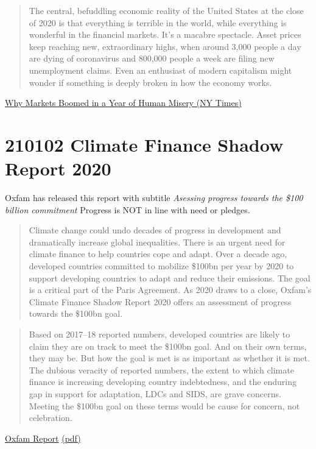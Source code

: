 \documentclass[
]{book}
\begin{document}
\begin{quote}
The central, befuddling economic reality of the United States at the close of 2020 is that everything is terrible in the world, while everything is wonderful in the financial markets.
It's a macabre spectacle. Asset prices keep reaching new, extraordinary highs, when around 3,000 people a day are dying of coronavirus and 800,000 people a week are filing new unemployment claims. Even an enthusiast of modern capitalism might wonder if something is deeply broken in how the economy works.
\end{quote}

\href{https://www.nytimes.com/2021/01/01/upshot/why-markets-boomed-2020.html}{Why Markets Boomed in a Year of Human Misery (NY Times)}

\hypertarget{climate-finance-shadow-report-2020}{%
\section{210102 Climate Finance Shadow Report 2020}\label{climate-finance-shadow-report-2020}}

Oxfam has released this report with subtitle \emph{Asessing progress towards the \$100 billion commitment}
Progress is NOT in line with need or pledges.

\begin{quote}
Climate change could undo decades of progress in development and dramatically increase global inequalities. There is an urgent need for climate finance to help countries cope and adapt.
Over a decade ago, developed countries committed to mobilize \$100bn per year by 2020 to support developing countries to adapt and reduce their emissions. The goal is a critical part of the Paris Agreement.
As 2020 draws to a close, Oxfam's Climate Finance Shadow Report 2020 offers an assessment of progress towards the \$100bn goal.
\end{quote}

\begin{quote}
Based on 2017--18 reported numbers, developed countries are likely to claim they are on track to meet
the \$100bn goal. And on their own terms, they may be. But how the goal is met is as important as whether
it is met. The dubious veracity of reported numbers, the extent to which climate finance is increasing
developing country indebtedness, and the enduring gap in support for adaptation, LDCs and SIDS, are grave
concerns. Meeting the \$100bn goal on these terms would be cause for concern, not celebration.
\end{quote}

\href{https://www.oxfam.org/en/research/climate-finance-shadow-report-2020}{Oxfam Report}
\href{/pdf/Oxfam_2020_Climate_Finance_Shadow_Report.pdf}{(pdf)}

  
\end{document}
